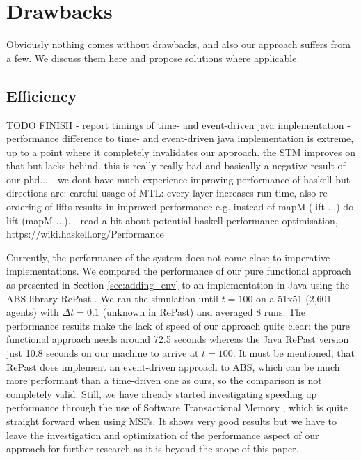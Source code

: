 \section{Drawbacks}
\label{sec:drawbacks}
Obviously nothing comes without drawbacks, and also our approach suffers from a few. We discuss them here and propose solutions where applicable.

\subsection{Efficiency}
TODO FINISH
- report timings of time- and event-driven java implementation
- performance difference to time- and event-driven java implementation is extreme, up to a point where it completely invalidates our approach. the STM improves on that but lacks behind. this is really really bad and basically a negative result of our phd...
- we dont have much experience improving performance of haskell but directions are: careful usage of MTL: every layer increases run-time, also re-ordering of lifts results in improved performance e.g. instead of mapM (lift ...) do lift (mapM ...).
- read a bit about potential haskell performance optimisation, https://wiki.haskell.org/Performance

Currently, the performance of the system does not come close to imperative implementations. We compared the performance of our pure functional approach as presented in Section \ref{sec:adding_env} to an implementation in Java using the ABS library RePast \cite{north_complex_2013}. We ran the simulation until $t = 100$ on a 51x51 (2,601 agents) with $\Delta t = 0.1$ (unknown in RePast) and averaged 8 runs. The performance results make the lack of speed of our approach quite clear: the pure functional approach needs around 72.5 seconds whereas the Java RePast version just 10.8 seconds on our machine to arrive at $t = 100$. It must be mentioned, that RePast does implement an event-driven approach to ABS, which can be much more performant \cite{meyer_event-driven_2014} than a time-driven one as ours, so the comparison is not completely valid. Still, we have already started investigating speeding up performance through the use of Software Transactional Memory \cite{harris_composable_2005, harris_transactional_2006}, which is quite straight forward when using MSFs. It shows very good results but we have to leave the investigation and optimization of the performance aspect of our approach for further research as it is beyond the scope of this paper.

